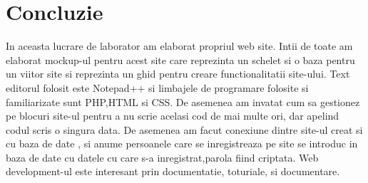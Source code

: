 \documentclass[12pt]{article}
\begin{document}

\cleardoublepage

\newpage

\setcounter{page}{1}
\setcounter{secnumdepth}{4}

\cleardoublepage


\clearpage
\section{Concluzie}
In aceasta lucrare de laborator am elaborat propriul web site. Intii de toate am elaborat mockup-ul pentru acest site care reprezinta un schelet si o baza pentru un viitor site si reprezinta un ghid pentru creare functionalitatii site-ului. Text editorul folosit este Notepad++ si limbajele de programare folosite si familiarizate sunt PHP,HTML si CSS. De asemenea am invatat cum sa gestionez pe blocuri site-ul pentru a nu scrie acelasi cod de mai multe ori, dar apelind codul scris o singura data. De asemenea am facut conexiune dintre site-ul creat si cu baza de date , si anume persoanele care se inregistreaza pe site se introduc in baza de date cu datele cu care s-a inregistrat,parola fiind criptata. Web development-ul este interesant prin documentatie, toturiale, si documentare.
\end{document}
